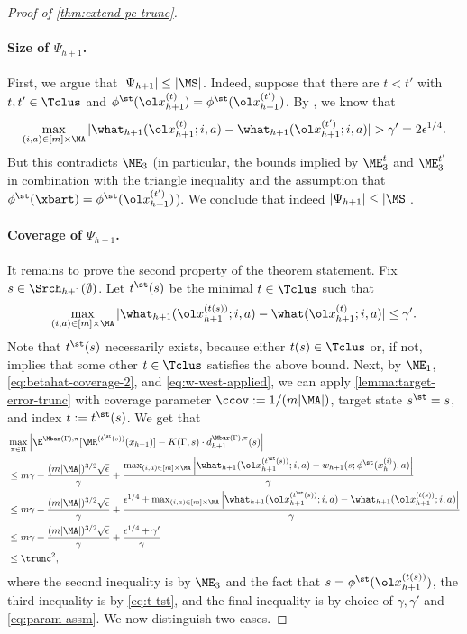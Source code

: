 \begin{proof}[Proof of \cref{thm:extend-pc-trunc}]
\paragraph{Size of $\Psi_{h+1}$.} First, we argue that $|\Psi_{h+1}| \leq |\MS|$. Indeed, suppose that there are $t < t'$ with $t,t' \in \Tclus$ and $\phi^\st(\ol x_{h+1}^{(t)}) = \phi^\st(\ol x_{h+1}^{(t')})$. By , we know that 
\[\max_{(i,a) \in [m]\times\MA} |\what_{h+1}(\ol x_{h+1}^{(t)};i,a) - \what_{h+1}(\ol x_{h+1}^{(t')};i,a)| > \gamma' = 2\epsilon^{1/4}.\] 
But this contradicts $\ME_3$ (in particular, the bounds implied by $\ME_3^t$ and $\ME_3^{t'}$ in combination with the triangle inequality and the assumption that $\phi^\st(\xbart) = \phi^\st(\ol x_{h+1}^{(t')})$). We conclude that indeed $|\Psi_{h+1}| \leq |\MS|$.

\paragraph{Coverage of $\Psi_{h+1}$.} It remains to prove the second property of the theorem statement. Fix $s \in \Srch_{h+1}(\emptyset)$. Let $t^\st(s)$ be the minimal $t \in \Tclus$ such that 
\begin{equation}\max_{(i,a) \in [m]\times\MA} |\what_{h+1}(\ol x_{h+1}^{(t(s))};i,a)-\what(\ol x_{h+1}^{(t)};i,a)| \leq \gamma'.\label{eq:t-tst}\end{equation}
Note that $t^\st(s)$ necessarily exists, because either $t(s) \in \Tclus$ or, if not,  implies that some other $t \in \Tclus$ satisfies the above bound. Next, by $\ME_1$, \cref{eq:betahat-coverage-2}, and \cref{eq:w-west-applied}, we can apply \cref{lemma:target-error-trunc} with coverage parameter $\ccov := 1/(m|\MA|)$, target state $s^\st = s$, and index $t := t^\st(s)$. We get that
\begin{align}
&\max_{\pi\in\Pi} \left|\E^{\Mbar(\Gamma),\pi}[\MR^{(t^\st(s))}(x_{h+1})] - K(\Gamma,s) \cdot d^{\Mbar(\Gamma),\pi}_{h+1}(s)\right|  \nonumber\\ 
&\leq m\gamma + \frac{(m|\MA|)^{3/2}\sqrt{\epsilon}}{\gamma} + \frac{\max_{(i,a)\in[m]\times\MA}\left|\what_{h+1}(\ol x^{(t^\st(s))}_{h+1};i,a) - w_{h+1}(s;\phi^\st(x_h^{(i)}),a)\right|}{\gamma} \nonumber \\ 
&\leq m\gamma + \frac{(m|\MA|)^{3/2}\sqrt{\epsilon}}{\gamma} + \frac{\epsilon^{1/4} + \max_{(i,a)\in[m]\times\MA}\left|\what_{h+1}(\ol x^{(t^\st(s))}_{h+1};i,a) - \what_{h+1}(\ol x^{(t(s))}_{h+1};i,a)\right|}{\gamma} \nonumber \\ 
&\leq m\gamma + \frac{(m|\MA|)^{3/2}\sqrt{\epsilon}}{\gamma} + \frac{\epsilon^{1/4} + \gamma'}{\gamma} \nonumber\\
&\leq \trunc^2,\label{eq:rkd-error}
\end{align}
where the second inequality is by $\ME_3$ and the fact that $s = \phi^\st(\ol x_{h+1}^{(t(s))})$, the third inequality is by \cref{eq:t-tst}, and the final inequality is by choice of $\gamma,\gamma'$ and \cref{eq:param-assm}. We now distinguish two cases.


\end{proof}

